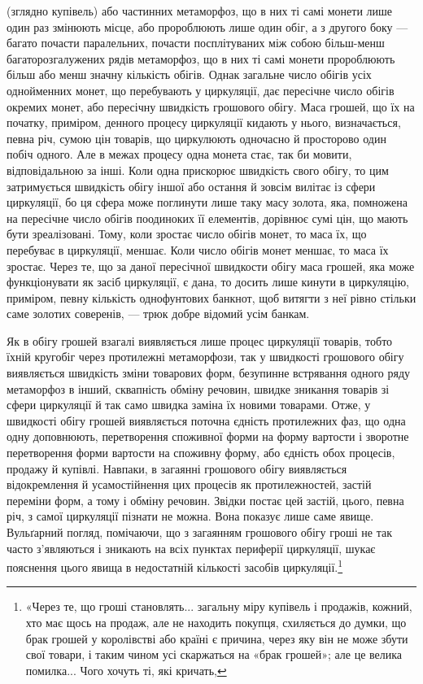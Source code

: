\parcont{}  %
(зглядно купівель) або частинних метаморфоз, що в них ті самі
монети лише один раз змінюють місце, або пророблюють лише
один обіг, а з другого боку — багато почасти паралельних,
почасти посплітуваних між собою більш-менш багаторозгалужених
рядів метаморфоз, що в них ті самі монети пророблюють
більш або менш значну кількість обігів. Однак загальне число
обігів усіх однойменних монет, що перебувають у циркуляції,
дає пересічне число обігів окремих монет, або пересічну швидкість
грошового обігу. Маса грошей, що їх на початку, приміром,
денного процесу циркуляції кидають у нього, визначається,
певна річ, сумою цін товарів, що циркулюють одночасно й просторово
один побіч одного. Але в межах процесу одна монета
стає, так би мовити, відповідальною за інші. Коли одна прискорює
швидкість свого обігу, то цим затримується швидкість обігу
іншої або остання й зовсім вилітає із сфери циркуляції, бо ця
сфера може поглинути лише таку масу золота, яка, помножена
на пересічне число обігів поодиноких її елементів, дорівнює сумі
цін, що мають бути зреалізовані. Тому, коли зростає число обігів
монет, то маса їх, що перебуває в циркуляції, меншає. Коли
число обігів монет меншає, то маса їх зростає. Через те, що за
даної пересічної швидкости обігу маса грошей, яка може функціонувати
як засіб циркуляції, є дана, то досить лише кинути
в циркуляцію, приміром, певну кількість однофунтових банкнот,
щоб витягти з неї рівно стільки саме золотих соверенів, — трюк
добре відомий усім банкам.

Як в обігу грошей взагалі виявляється лише процес циркуляції
товарів, тобто їхній кругобіг через протилежні метаморфози,
так у швидкості грошового обігу виявляється швидкість зміни
товарових форм, безупинне встрявання одного ряду метаморфоз
в інший, сквапність обміну речовин, швидке зникання товарів
зі сфери циркуляції й так само швидка заміна їх новими товарами.
Отже, у швидкості обігу грошей виявляється поточна єдність
протилежних фаз, що одна одну доповнюють, перетворення
споживної форми на форму вартости і зворотне перетворення
форми вартости на споживну форму, або єдність обох процесів,
продажу й купівлі. Навпаки, в загаянні грошового обігу виявляється
відокремлення й усамостійнення цих процесів як протилежностей,
застій переміни форм, а тому і обміну речовин. Звідки
постає цей застій, цього, певна річ, з самої циркуляції пізнати
не можна. Вона показує лише саме явище. Вульґарний погляд,
помічаючи, що з загаянням грошового обігу гроші не так часто
з’являються і зникають на всіх пунктах периферії циркуляції,
шукає пояснення цього явища в недостатній кількості засобів
циркуляції.\footnote{
«Через те, що гроші становлять... загальну міру купівель і продажів,
кожний, хто має щось на продаж, але не находить покупця, схиляється
до думки, що брак грошей у королівстві або країні є причина,
через яку він не може збути свої товари, і таким чином усі скаржаться на
«брак грошей»; але це велика помилка... Чого хочуть ті, які кричать,
}


